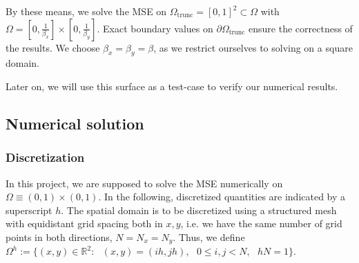 \documentclass[11pt]{scrartcl}
\begin{document}
By these means, we solve the MSE on $\Omega_\text{trunc}=[0,1]^2\subset\Omega$ with $\Omega=[0,\frac{1}{\beta_x}]\times[0,\frac{1}{\beta_y}]$. Exact boundary values on $\partial\Omega_\text{trunc}$ ensure the correctness of the results. We choose $\beta_x=\beta_y=\beta$, as we restrict ourselves to solving on a square domain.

Later on, we will use this surface as a test-case to verify our numerical results.

\newpage
\subsection{Numerical solution}
\subsubsection{Discretization}
\label{section:Discretization}
In this project, we are supposed to solve the MSE numerically on $\Omega \equiv (0,1)\times(0,1)$. In the following, discretized quantities are indicated by a superscript $h$. The spatial domain is to be discretized using a structured mesh with equidistant grid spacing both in $x,y$, i.e. we have the same number of grid points in both directions, $N=N_x=N_y$. Thus, we define $\Omega^h := \{ (x,y) \in \mathbb{R}^2:\text{ }(x,y) = (ih, jh), \text{ } 0 \le i,j < N,\text{ }hN=1\}$.
\end{document}
